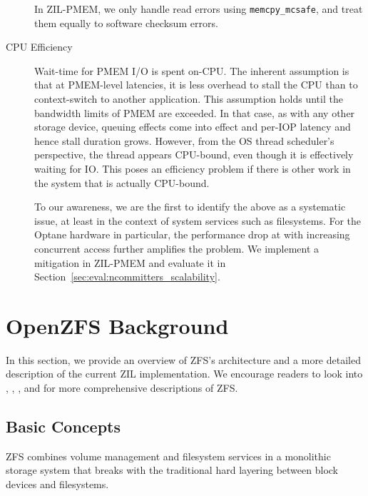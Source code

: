 \documentclass[12pt,a4paper,twoside]{book}
\begin{document}
\begin{description}
        In ZIL-PMEM, we only handle read errors using \lstinline{memcpy_mcsafe}, and treat them equally to software checksum errors.

    \item[CPU Efficiency] Wait-time for PMEM I/O is spent on-CPU.
        The inherent assumption is that at PMEM-level latencies, it is less overhead to stall the CPU than to context-switch to another application.
        This assumption holds until the bandwidth limits of PMEM are exceeded.
        In that case, as with any other storage device, queuing effects come into effect and per-IOP latency and hence stall duration grows.
        However, from the OS thread scheduler's perspective, the thread appears CPU-bound, even though it is effectively waiting for IO.
        This poses an efficiency problem if there is other work in the system that is actually CPU-bound.

        To our awareness, we are the first to identify the above as a systematic issue, at least in the context of system services such as filesystems.
        For the Optane hardware in particular, the performance drop at with increasing concurrent access further amplifies the problem.
        We implement a mitigation in ZIL-PMEM and evaluate it in Section~\ref{sec:eval:ncommitters_scalability}.
\end{description}

\section{OpenZFS Background}\label{sec:openzfs_background}

In this section, we provide an overview of ZFS's architecture and a more detailed description of the current ZIL implementation.
We encourage readers to look into \cite{bonwickZettabyteFileSystem2003}, \cite{zhangEndtoendDataIntegrity2010}, \cite{mckusickDesignImplementationFreeBSD2014}, and \cite{openzfsMattAhrensLecture2016} for more comprehensive descriptions of ZFS.

\subsection{Basic Concepts}\label{sec:openzfs_background:basic_concepts}
ZFS combines volume management and filesystem services in a monolithic storage system that breaks with the traditional hard layering between block devices and filesystems.
\end{document}
